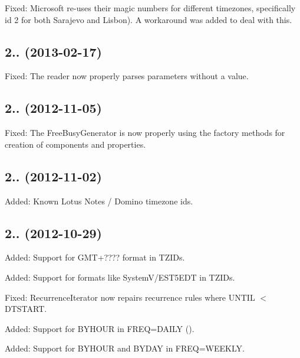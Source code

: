 \begin{DoxyItemize}
\item Fixed\+: Microsoft re-\/uses their magic numbers for different timezones, specifically id 2 for both Sarajevo and Lisbon). A workaround was added to deal with this.
\end{DoxyItemize}

\subsection*{2.. (2013-\/02-\/17) }


\begin{DoxyItemize}
\item Fixed\+: The reader now properly parses parameters without a value.
\end{DoxyItemize}

\subsection*{2.. (2012-\/11-\/05) }


\begin{DoxyItemize}
\item Fixed\+: The Free\+Busy\+Generator is now properly using the factory methods for creation of components and properties.
\end{DoxyItemize}

\subsection*{2.. (2012-\/11-\/02) }


\begin{DoxyItemize}
\item Added\+: Known Lotus Notes / Domino timezone id\textquotesingle{}s.
\end{DoxyItemize}

\subsection*{2.. (2012-\/10-\/29) }


\begin{DoxyItemize}
\item Added\+: Support for \textquotesingle{}G\+M\+T+????\textquotesingle{} format in T\+Z\+ID\textquotesingle{}s.
\item Added\+: Support for formats like System\+V/\+E\+S\+T5\+E\+DT in T\+Z\+ID\textquotesingle{}s.
\item Fixed\+: Recurrence\+Iterator now repairs recurrence rules where U\+N\+T\+IL $<$ D\+T\+S\+T\+A\+RT.
\item Added\+: Support for B\+Y\+H\+O\+UR in F\+R\+EQ=D\+A\+I\+LY ().
\item Added\+: Support for B\+Y\+H\+O\+UR and B\+Y\+D\+AY in F\+R\+EQ=W\+E\+E\+K\+LY.
\end{DoxyItemize}

